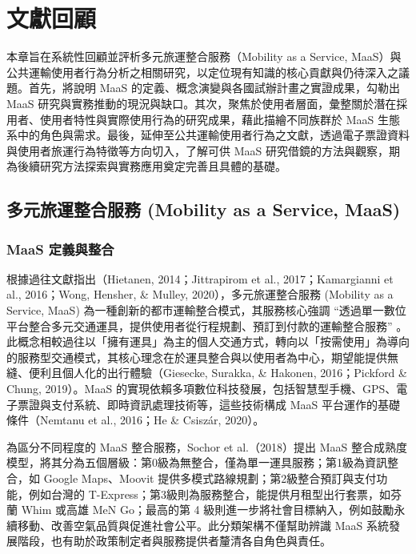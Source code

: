 
\providecommand{\tightlist}{%
  \setlength{\itemsep}{0pt}\setlength{\parskip}{0pt}
}

\chapter{文獻回顧}\label{ux6587ux737bux56deux9867}

本章旨在系統性回顧並評析多元旅運整合服務（Mobility as a Service,
MaaS）與公共運輸使用者行為分析之相關研究，以定位現有知識的核心貢獻與仍待深入之議題。首先，將說明
MaaS 的定義、概念演變與各國試辦計畫之實證成果，勾勒出 MaaS
研究與實務推動的現況與缺口。其次，聚焦於使用者層面，彙整關於潛在採用者、使用者特性與實際使用行為的研究成果，藉此描繪不同族群於
MaaS
生態系中的角色與需求。最後，延伸至公共運輸使用者行為之文獻，透過電子票證資料與使用者旅運行為特徵等方向切入，了解可供
MaaS
研究借鏡的方法與觀察，期為後續研究方法探索與實務應用奠定完善且具體的基礎。

\section{多元旅運整合服務 (Mobility as a Service,
MaaS)}\label{ux591aux5143ux65c5ux904bux6574ux5408ux670dux52d9-mobility-as-a-service-maas}

\subsection{MaaS 定義與整合}\label{maas-ux5b9aux7fa9ux8207ux6574ux5408}

根據過往文獻指出（Hietanen, 2014；Jittrapirom et al., 2017；Kamargianni
et al., 2016；Wong, Hensher, \& Mulley, 2020），多元旅運整合服務
(Mobility as a Service, MaaS)
為一種創新的都市運輸整合模式，其服務核心強調
``透過單一數位平台整合多元交通運具，提供使用者從行程規劃、預訂到付款的運輸整合服務''
。此概念相較過往以「擁有運具」為主的個人交通方式，轉向以「按需使用」為導向的服務型交通模式，其核心理念在於運具整合與以使用者為中心，期望能提供無縫、便利且個人化的出行體驗（Giesecke,
Surakka, \& Hakonen, 2016；Pickford \& Chung, 2019）。MaaS
的實現依賴多項數位科技發展，包括智慧型手機、GPS、電子票證與支付系統、即時資訊處理技術等，這些技術構成
MaaS 平台運作的基礎條件（Nemtanu et al., 2016；He \& Csiszár, 2020）。

為區分不同程度的 MaaS 整合服務，Sochor et al.（2018）提出 MaaS
整合成熟度模型，將其分為五個層級：第0級為無整合，僅為單一運具服務；第1級為資訊整合，如
Google Maps、Moovit
提供多模式路線規劃；第2級整合預訂與支付功能，例如台灣的
T-Express；第3級則為服務整合，能提供月租型出行套票，如芬蘭 Whim 或高雄
MeN Go；最高的第 4
級則進一步將社會目標納入，例如鼓勵永續移動、改善空氣品質與促進社會公平。此分類架構不僅幫助辨識
MaaS 系統發展階段，也有助於政策制定者與服務提供者釐清各自角色與責任。

